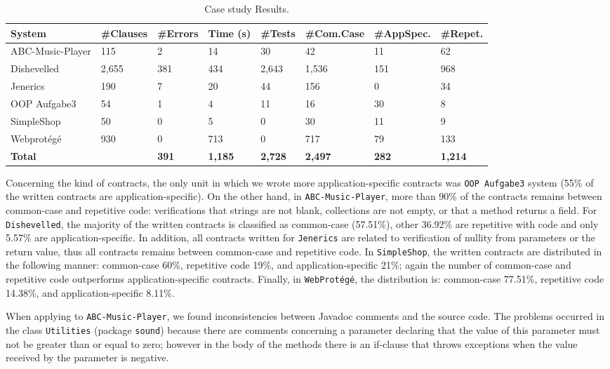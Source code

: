 \begin{table}[h]
\caption{Case study Results.}
\label{tab:caseStudyResults}
\centering
\begin{tabular}{l l l l l l l l}
\hline
 \bfseries System &
 \bfseries \#Clauses & 
 \bfseries \#Errors & 
 \bfseries Time (s) &
 \bfseries \#Tests &
 \bfseries \#Com.Case &
 \bfseries \#AppSpec. &
 \bfseries \#Repet. \\ \hline
ABC-Music-Player & 115 & 2 & 14 & 30 & 42 & 11 & 62 \\
Dishevelled & 2,655 & 381 & 434 & 2,643 & 1,536 & 151 & 968 \\
Jenerics & 190 & 7 & 20 & 44 & 156 & 0 & 34 \\
OOP Aufgabe3 & 54 & 1 & 4 & 11 & 16 & 30 & 8 \\
SimpleShop & 50 & 0 & 5 & 0 & 30 & 11 & 9 \\
Webprot\'{e}g\'{e} & 930 & 0 & 713 & 0 & 717 & 79 & 133 \\ \hline

 \bfseries Total & 
 \bfseries \totalClauses{} & 
 \bfseries 391 &
 \bfseries 1,185 &
 \bfseries 2,728 &
 \bfseries 2,497 &
 \bfseries 282 &
 \bfseries 1,214
\\
\bottomrule
\end{tabular}
\end{table}


Concerning the kind of contracts, the only unit in which we wrote more
application-specific contracts was \texttt{OOP Aufgabe3} system (55\% of the
written contracts are application-specific). On the other hand, in \texttt{ABC-Music-Player}, more than 90\% of the contracts remains between common-case and
repetitive code: verifications that strings are not blank, collections are not
empty, or that a method returns a field.
For \texttt{Dishevelled}, the majority of the written contracts is classified as common-case
(57.51\%), other 36.92\% are repetitive with code and only 5.57\% are application-specific.
In addition, all contracts written for \texttt{Jenerics} are related to
verification of nullity from parameters or the return value, thus all contracts
remains between common-case and repetitive code. In \texttt{SimpleShop}, the
written contracts are distributed in the following manner: common-case 60\%, repetitive code 19\%, and application-specific 21\%; again the number of common-case and repetitive code outperforms application-specific contracts. Finally,
in \texttt{WebProt\'{e}g\'{e}}, the distribution is: common-case 77.51\%, repetitive code 14.38\%, and application-specific 8.11\%.  

When applying \contractjdoc{} to \texttt{ABC-Music-Player}, we found inconsistencies between Javadoc
comments and the source code. The problems occurred in the class \texttt{Utilities} (package
\texttt{sound}) because there are comments concerning a parameter declaring that the value of
this parameter must not be greater than or equal to zero; however in the body of the methods there
is an if-clause that throws exceptions when the value received by the parameter is negative.




